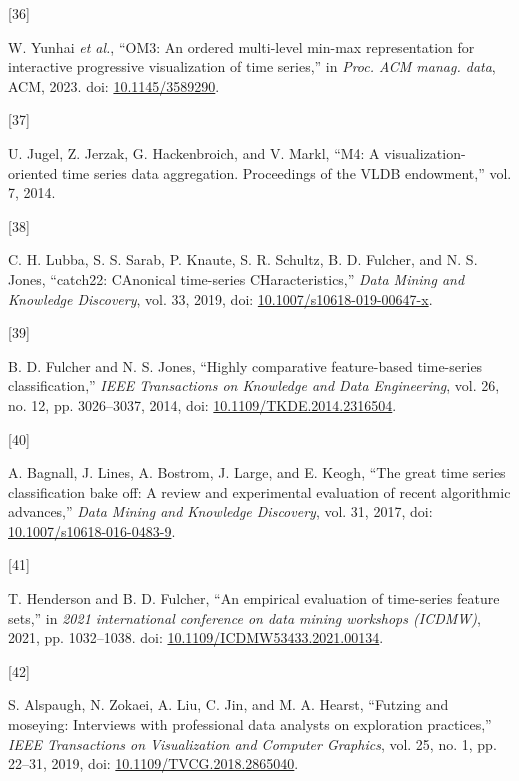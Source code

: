 \documentclass{article}
\newlength{\cslhangindent}
\newlength{\csllabelwidth}
\newlength{\cslentryspacingunit} %
\newenvironment{CSLReferences}[2] %
 {%
  \setlength{\parindent}{0pt}
  \ifodd #1
  \let\oldpar\par
  \def\par{\hangindent=\cslhangindent\oldpar}
  \fi
  \setlength{\parskip}{#2\cslentryspacingunit}
 }%
 {}
\newcommand{\CSLLeftMargin}[1]{\parbox[t]{\csllabelwidth}{#1}}
\newcommand{\CSLRightInline}[1]{\parbox[t]{\linewidth - \csllabelwidth}{#1}\break}
\begin{document}
\begin{CSLReferences}{0}{0}
\leavevmode{}%
\CSLLeftMargin{{[}36{]} }
\CSLRightInline{W. Yunhai \emph{et al.}, {``OM3: An ordered multi-level
min-max representation for interactive progressive visualization of time
series,''} in \emph{Proc. ACM manag. data}, ACM, 2023. doi:
\href{https://doi.org/10.1145/3589290}{10.1145/3589290}.}

\leavevmode{}%
\CSLLeftMargin{{[}37{]} }
\CSLRightInline{U. Jugel, Z. Jerzak, G. Hackenbroich, and V. Markl,
{``M4: A visualization-oriented time series data aggregation.
Proceedings of the VLDB endowment,''} vol. 7, 2014.}

\leavevmode{}%
\CSLLeftMargin{{[}38{]} }
\CSLRightInline{C. H. Lubba, S. S. Sarab, P. Knaute, S. R. Schultz, B.
D. Fulcher, and N. S. Jones, {``catch22: CAnonical time-series
CHaracteristics,''} \emph{Data Mining and Knowledge Discovery}, vol. 33,
2019, doi:
\href{https://doi.org/10.1007/s10618-019-00647-x}{10.1007/s10618-019-00647-x}.}

\leavevmode{}%
\CSLLeftMargin{{[}39{]} }
\CSLRightInline{B. D. Fulcher and N. S. Jones, {``Highly comparative
feature-based time-series classification,''} \emph{IEEE Transactions on
Knowledge and Data Engineering}, vol. 26, no. 12, pp. 3026--3037, 2014,
doi:
\href{https://doi.org/10.1109/TKDE.2014.2316504}{10.1109/TKDE.2014.2316504}.}

\leavevmode{}%
\CSLLeftMargin{{[}40{]} }
\CSLRightInline{A. Bagnall, J. Lines, A. Bostrom, J. Large, and E.
Keogh, {``The great time series classification bake off: A review and
experimental evaluation of recent algorithmic advances,''} \emph{Data
Mining and Knowledge Discovery}, vol. 31, 2017, doi:
\href{https://doi.org/10.1007/s10618-016-0483-9}{10.1007/s10618-016-0483-9}.}

\leavevmode{}%
\CSLLeftMargin{{[}41{]} }
\CSLRightInline{T. Henderson and B. D. Fulcher, {``An empirical
evaluation of time-series feature sets,''} in \emph{2021 international
conference on data mining workshops (ICDMW)}, 2021, pp. 1032--1038. doi:
\href{https://doi.org/10.1109/ICDMW53433.2021.00134}{10.1109/ICDMW53433.2021.00134}.}

\leavevmode{}%
\CSLLeftMargin{{[}42{]} }
\CSLRightInline{S. Alspaugh, N. Zokaei, A. Liu, C. Jin, and M. A.
Hearst, {``Futzing and moseying: Interviews with professional data
analysts on exploration practices,''} \emph{IEEE Transactions on
Visualization and Computer Graphics}, vol. 25, no. 1, pp. 22--31, 2019,
doi:
\href{https://doi.org/10.1109/TVCG.2018.2865040}{10.1109/TVCG.2018.2865040}.}


\end{CSLReferences}
\end{document}

